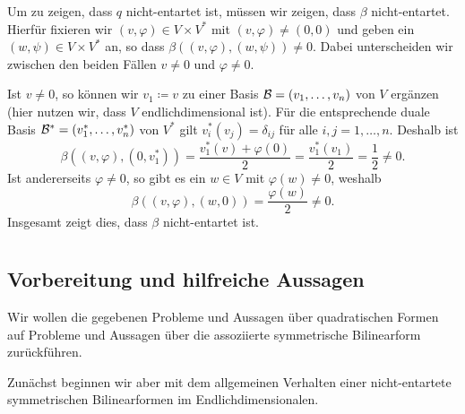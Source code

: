 \documentclass[a4paper,10pt,numbers=noenddot]{scrartcl}
\begin{document}
Um zu zeigen, dass $q$ nicht-entartet ist, müssen wir zeigen, dass $\beta$ nicht-entartet.
Hierfür fixieren wir $(v, \varphi) \in V \times V^*$ mit $(v, \varphi) \neq (0,0)$ und geben ein $(w, \psi) \in V \times V^*$ an, so dass $\beta((v, \varphi), (w, \psi)) \neq 0$.
Dabei unterscheiden wir zwischen den beiden Fällen $v \neq 0$ und $\varphi \neq 0$.

Ist $v \neq 0$, so können wir $v_1 \coloneqq v$ zu einer Basis $\mathcal{B} = (v_1, \dotsc, v_n)$ von $V$ ergänzen (hier nutzen wir, dass $V$ endlichdimensional ist).
Für die entsprechende duale Basis $\mathcal{B}^* = (v_1^*, \dotsc, v_n^*)$ von $V^*$ gilt $v_i^*(v_j) = \delta_{ij}$ für alle $i,j = 1, \dotsc, n$.
Deshalb ist
\[
        \beta((v, \varphi), (0, v_1^*))
  =     \frac{v_1^*(v) + \varphi(0)}{2}
  =     \frac{v_1^*(v_1)}{2}
  =     \frac{1}{2}
  \neq  0.
\]
Ist andererseits $\varphi \neq 0$, so gibt es ein $w \in V$ mit $\varphi(w) \neq 0$, weshalb
\[
    \beta((v, \varphi), (w,0))
  = \frac{\varphi(w)}{2}
  \neq 0.
\]
Insgesamt zeigt dies, dass $\beta$ nicht-entartet ist.










\section{}





\subsection{Vorbereitung und hilfreiche Aussagen}


Wir wollen die gegebenen Probleme und Aussagen über quadratischen Formen auf Probleme und Aussagen über die assoziierte symmetrische Bilinearform zurückführen.


Zunächst beginnen wir aber mit dem allgemeinen Verhalten einer nicht-entartete symmetrischen Bilinearformen im Endlichdimensionalen.
\end{document}
